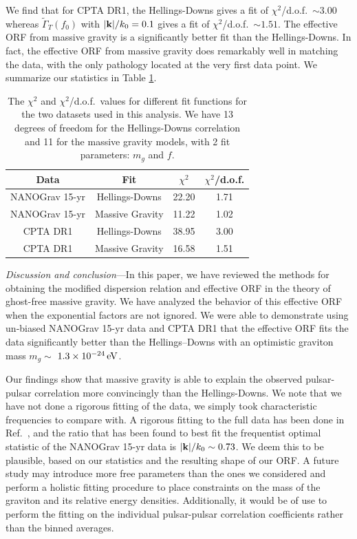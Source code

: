 \documentclass[prd,twocolumn,aps,psfig,nofootinbib,nobibnotes,superscriptaddress,preprintnumbers,times]{revtex4-2}
\newcommand{\eV}{\,{\rm eV}}
\begin{document}
We find that for CPTA DR1, the Hellings-Downs gives a fit of $\chi^2$/d.o.f.\ $\sim 3.00$ whereas $\tilde{\Gamma}_T(f_0)$ with $|{\bf k}|/k_0 = 0.1$ gives a fit of $\chi^2$/d.o.f.\ $\sim 1.51$. The effective ORF from massive gravity is a significantly better fit than the Hellings-Downs. In fact, the effective ORF from massive gravity does remarkably well in matching the data, with the only pathology located at the very first data point.
We summarize our statistics in Table \ref{tbl:chi}. 
\begin{table}[h] 
\centering
\renewcommand{\arraystretch}{1.8}
\begin{tabular}{|c|c|c|c|}
\hline
\textbf{Data} & \textbf{Fit} & \textbf{$\chi^2$} & \textbf{$\chi^2$/d.o.f.} \\
\hline
NANOGrav 15-yr & Hellings-Downs & 22.20 & 1.71 \\
\hline
NANOGrav 15-yr & Massive Gravity & 11.22 & 1.02 \\
\hline
CPTA DR1 & Hellings-Downs & 38.95 & 3.00 \\
\hline
CPTA DR1 & Massive Gravity & 16.58 & 1.51 \\
\hline
\end{tabular}
\caption{The $\chi^2$ and $\chi^2$/d.o.f.\ values for different fit functions for the two datasets used in this analysis. We have 13 degrees of freedom for the Hellings-Downs correlation and 11 for the massive gravity models, with 2 fit parameters: $m_g$ and $f$. }
\label{tbl:chi}
\end{table}

\textit{Discussion and conclusion}---In this paper, we have reviewed the methods for obtaining the modified dispersion relation and effective ORF in the theory of ghost-free massive gravity. We have analyzed the behavior of this effective ORF when the exponential factors are not ignored. We were able to demonstrate using un‑biased NANOGrav 15-yr data and CPTA DR1 that the effective ORF fits the data significantly better than the Hellings–Downs with an optimistic graviton mass $m_g \sim$ $1.3\times10^{-24} \eV$.

Our findings show that massive gravity is able to explain the observed pulsar-pulsar correlation more convincingly than the Hellings-Downs. We note that we have not done a rigorous fitting of the data, we simply took characteristic frequencies to compare with. A rigorous fitting to the full data has been done in Ref.\ \cite{Arjona:2024cex}, and the ratio that has been found to best fit the frequentist optimal statistic of the NANOGrav 15-yr data is $|{\bf k}|/k_0 \sim 0.73$. We deem this to be plausible, based on our statistics and the resulting shape of our ORF. A future study may introduce more free parameters than the ones we considered and perform a holistic fitting procedure to place constraints on the mass of the graviton and its relative energy densities. Additionally, it would be of use to perform the fitting on the individual pulsar-pulsar correlation coefficients rather than the binned averages. 
\end{document}
